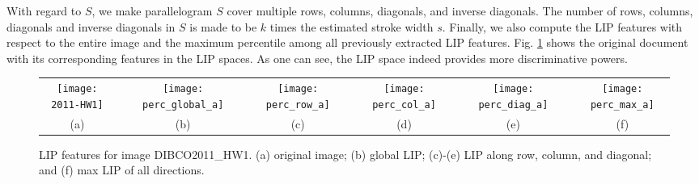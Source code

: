 \documentclass[onecolumn,11pt,draftcls,journal]{IEEEtran}
\def\fwIb{.16}
\begin{document}
With regard to $S$, we make parallelogram $S$ cover multiple rows, columns, diagonals, and inverse diagonals. The number of rows, columns, diagonals and inverse diagonals in $S$ is made to be $k$ times the estimated stroke width $s$. Finally, we also compute the LIP features with respect to the entire image and the maximum percentile among all previously extracted LIP features. Fig. \ref{fig.lip} shows the original document with its corresponding features in the LIP spaces. As one can see, the LIP space indeed provides more discriminative powers. 
\begin{figure}[!h]
\centering\scriptsize
\begin{tabular}{@{}c@{}m{.05cm}@{}c@{}m{.05cm}@{}c@{}m{.05cm}@{}c@{}m{.05cm}@{}c@{}m{.05cm}@{}c@{}}
\texttt{[image: 2011-HW1]}&&
\texttt{[image: perc\_global\_a]}&&
\texttt{[image: perc\_row\_a]}&&
\texttt{[image: perc\_col\_a]}&&
\texttt{[image: perc\_diag\_a]}&&
\texttt{[image: perc\_max\_a]}\\{(a)}&&
{(b)}&&
{(c)}&&
{(d)}&&
{(e)}&&
{(f)}\\
\end{tabular}
\caption{LIP features for image DIBCO2011\_HW1. (a) original  image; (b) global LIP; (c)-(e) LIP along row, column, and diagonal; and (f) max LIP of all directions.}\label{fig.lip}
\end{figure}
\end{document}
